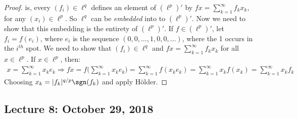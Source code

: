 \documentclass[crop=false,class=article,oneside]{standalone}
\begin{document}
\begin{proof}
                is, every $(f_{i})\in\ell^{q}$ defines an element
                of $(\ell^{p})'$ by
                $fx=\sum_{k=1}^{\infty}f_{k}x_{k}$, for any
                $(x_{i})\in\ell^{p}$. So $\ell^{q}$ can
                be \textit{embedded} into to $(\ell^{p})'$.
                Now we need to show that this embedding is
                the entirety of $(\ell^{p})'$. If
                $f\in(\ell^{p})'$, let
                $f_{i}=f(e_{i})$, where $e_{i}$ is the
                sequence $(0,0,\hdots,1,0,0,\hdots)$, where
                the 1 occurs in the $i^{th}$ spot. We need
                to show that $(f_{i})\in\ell^{q}$ and
                $fx=\sum_{k=1}^{\infty}f_{k}x_{k}$
                for all $x\in\ell^{p}$. If $x\in\ell^{p}$, then:
                \begin{align*}
                    x=\sum_{k=1}^{\infty}x_{k}e_{k}
                    \Rightarrow
                    fx=f\Big(\sum_{k=1}^{\infty}x_{k}e_{k}\Big)
                    =\sum_{k=1}^{\infty}f(x_{k}e_{k})
                    =\sum_{k=1}^{\infty}x_{k}f(x_{k})
                    =\sum_{k=1}^{\infty}x_{k}f_{k}
                \end{align*}
                Choosing $x_{k}=|f_{k}|^{q/p}\sgn(f_{k})$ and apply
                H\"{o}lder.
            \end{proof}
    \subsection{Lecture 8: October 29, 2018}
\end{document}
